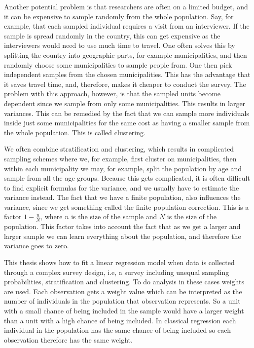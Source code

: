 \documentclass{article}
\begin{document}
Another potential problem is that researchers are often on a limited budget, and
it can be expensive to sample randomly from the whole population. Say,
for example, that 
each sampled individual requires a visit from an interviewer. If the sample is spread randomly in the country, this can get
expensive as the interviewers would need to use much time to travel. One often solves
this by splitting the country into geographic parts, for example municipalities, and
then randomly choose some municipalities to sample people from. One then pick
independent samples from the chosen municipalities. This has the advantage that it
saves travel time, and, therefore, makes it cheaper to conduct the
survey. The problem with this approach, however, is that the sampled units become
dependent since we sample from only some municipalities. This results in larger
variances. This can be remedied by the fact that we can sample more
individuals inside just some municipalities for the same
cost as having a smaller sample from the whole
population. This is called clustering.

We often combine stratification and clustering, which results in complicated
sampling schemes where we, for example, first cluster on municipalities, then within
each municipality we may, for example, split the population by age and sample from all
the age groups. Because this gets complicated, it is often difficult to
find explicit formulas for the variance, and we usually have to estimate the variance
instead. 
The fact that we have a finite population, also influences the variance, since we
get something called the finite population correction. This is a factor \(1 -
\frac{n}{N}\), where \(n\) is the size of the sample and \(N\) is the size of
the population. This factor takes into account the fact that as we get a larger
and larger sample we can learn everything about the population, and therefore
the variance goes to zero.

This thesis shows how to fit
a linear regression model when data is collected through a complex survey design, i.e,
a survey including unequal sampling probabilities, stratification and
clustering. To do analysis in these cases weights are used. Each observation gets a weight
value which can be interpreted as the number of individuals in the population
that observation represents. So a unit with a small chance of being
included in the sample would have a larger weight than a unit with a high chance of
being included.
In classical regression each individual in the population has the same chance of
being included so each observation therefore has the same weight.
\end{document}
